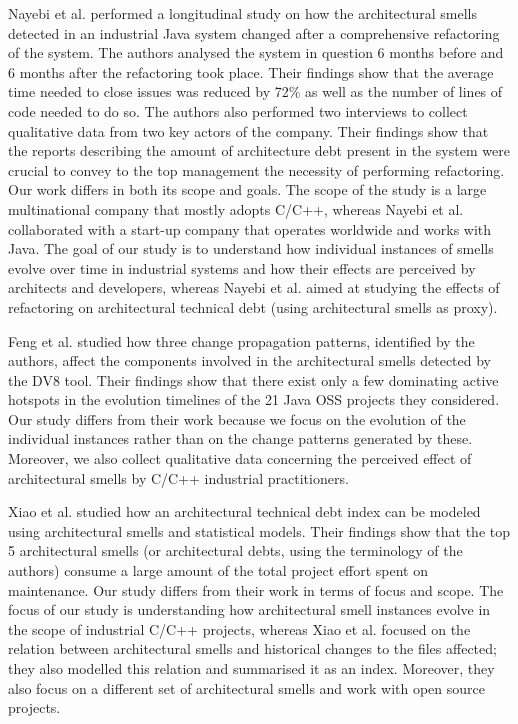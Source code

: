 Nayebi et al. \cite{Nayebi2019} performed a longitudinal study on how the architectural smells detected in an industrial Java system changed after a comprehensive refactoring of the system. 
The authors analysed the system in question 6 months before and 6 months after the refactoring took place.
Their findings show that the average time needed to close issues was reduced by 72\% as well as the number of lines of code needed to do so.
The authors also performed two interviews to collect qualitative data from two key actors of the company.
Their findings show that the reports describing the amount of architecture debt present in the system were crucial to convey to the top management the necessity of performing refactoring.
Our work differs in both its scope and goals.
The scope of the study is a large multinational company that mostly adopts C/C++, whereas Nayebi et al. collaborated with a start-up company that operates worldwide and works with Java.
The goal of our study is to understand how individual instances of smells evolve over time in industrial systems and how their effects are perceived by architects and developers, whereas Nayebi et al. aimed at studying the effects of refactoring on architectural technical debt (using architectural smells as proxy).

Feng et al. \cite{Feng2019} studied how three change propagation patterns, identified by the authors, affect the components involved in the architectural smells detected by the DV8 tool. 
Their findings show that there exist only a few dominating active hotspots in the evolution timelines of the 21 Java OSS projects they considered.
Our study differs from their work because we focus on the evolution of the individual instances rather than on the change patterns generated by these.
Moreover, we also collect qualitative data concerning the perceived effect of architectural smells by C/C++ industrial practitioners.

Xiao et al. \cite{Xiao2016} studied how an architectural technical debt index can be modeled using architectural smells and statistical models. Their findings show that the top 5 architectural smells (or architectural debts, using the terminology of the authors) consume a large amount of the total project effort spent on maintenance.
Our study differs from their work in terms of focus and scope. 
The focus of our study is understanding how architectural smell instances evolve in the scope of industrial C/C++ projects, whereas Xiao et al. focused on the relation between architectural smells and historical changes to the files affected; they also modelled this relation and summarised it as an index.
Moreover, they also focus on a different set of architectural smells and work with open source projects.

